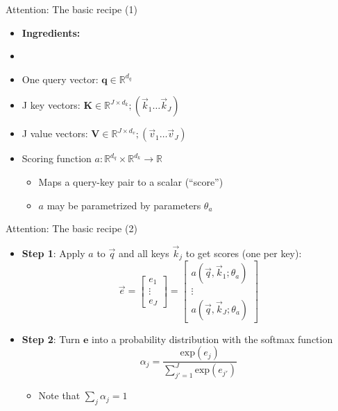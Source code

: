 \begin{vbframe}{Attention: The basic recipe (1)}

\vfill

\begin{itemize}
	\item \textbf{Ingredients:}
	\item[]
	\item One query vector: $\mathbf{q} \in \mathbb{R}^{d_q}$
	\item J key vectors: $\mathbf{K} \in \mathbb{R}^{J \times d_k}; (\vec k_1 \ldots \vec k_J)$
	\item J value vectors: $\mathbf{V} \in \mathbb{R}^{J \times d_v}; (\vec v_1 \ldots \vec v_J)$
	\item Scoring function $a : \mathbb{R}^{d_q} \times \mathbb{R}^{d_k} \rightarrow \mathbb{R}$
		\begin{itemize}
			\item Maps a query-key pair to a scalar (``score'')
			\item $a$ may be parametrized by parameters $\theta_a$
		\end{itemize}
\end{itemize}

\vfill

\end{vbframe}


\begin{vbframe}{Attention: The basic recipe (2)}

\vfill

\begin{itemize}
	\item \textbf{Step 1}: Apply $a$ to $\vec q$ and all keys $\vec k_j$ to get scores (one per key): 
	$$\vec e = \begin{bmatrix} e_1 \\ \vdots \\ e_J \end{bmatrix} =  \begin{bmatrix} a(\vec q, \vec k_1; \theta_a) \\ \vdots \\ a(\vec q, \vec k_J; \theta_a) \end{bmatrix}$$
	\item \textbf{Step 2}: Turn $\mathbf{e}$ into a probability distribution with the softmax function
	$$\alpha_j = \frac{\mathrm{exp}(e_j)}{\sum_{j'=1}^J \mathrm{exp}(e_{j'})}$$
		\begin{itemize}
			\item Note that $\sum_j \alpha_j = 1$
		\end{itemize}
\end{itemize}

\vfill

\end{vbframe}

